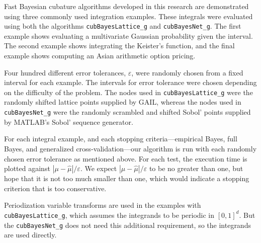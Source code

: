 \documentclass{iitthesis}          %
\newcommand{\hmu}{\widehat{\mu}}
\newcommand{\code}[1]{\texttt{#1}}
\def\abs#1{\ensuremath{\left \lvert #1 \right \rvert}}
\newcommand\secref{Section~\ref}
\newcommand{\JRNote}[1]{}
\begin{document}
\label{sec:NumExp}

\JRNote{use uniformly randomly chosen $\varepsilon$ instead 4 fixed}

Fast Bayesian cubature algorithms developed in this research are demonstrated using three commonly used integration examples.
These integrals were evaluated using both the algorithms \code{cubBayesLattice\_g} and \code{cubBayesNet\_g}. The first example shows evaluating a multivariate Gaussian probability given the interval. The second example shows integrating the Keister's function, and the final example shows computing an Asian arithmetic option pricing.  

\label{sec:numerical_experiments_cubBayesLattice}

Four hundred different error tolerances, $\varepsilon$, were randomly chosen from a fixed interval  for each example. 
The intervals for error tolerance were chosen depending on the difficulty of the problem.
The nodes used in \allowbreak \code{cubBayesLattice\_g} were the randomly shifted lattice points supplied by GAIL, whereas the nodes used in \code{cubBayesNet\_g} were the randomly scrambled and shifted Sobol' points supplied by MATLAB's Sobol' sequence generator. 

For each integral example, and each stopping criteria---empirical Bayes, full Bayes, and generalized cross-validation---our algorithm is run with each randomly chosen error tolerance as mentioned above.  For each test, the execution time is plotted against $\abs{\mu - \hmu}/\varepsilon$.  We expect $\abs{\mu - \hmu}/\varepsilon$ to be no greater than one, but hope that it is not too much smaller than one, which would indicate a stopping criterion that is too conservative.


Periodization variable transforms are used in the examples with \\ \allowbreak \code{cubBayesLattice\_g}, which assumes the integrands to be periodic in $[0,1]^d$. But the \allowbreak \code{cubBayesNet\_g} does not need this additional requirement, so the integrands are used directly.
\end{document}
